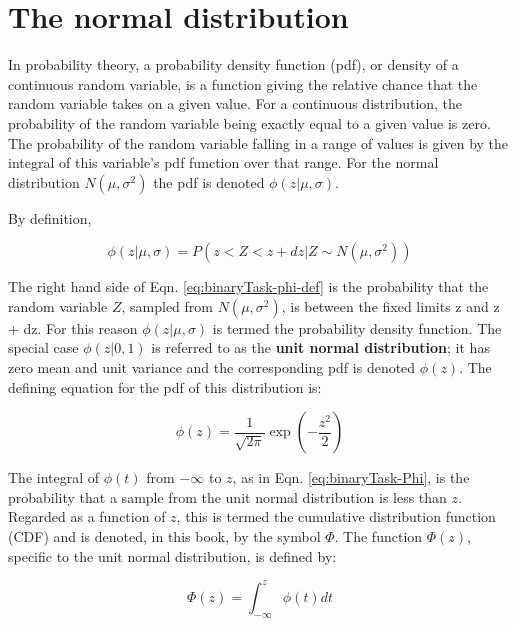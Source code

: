\documentclass[
]{book}
\begin{document}
\hypertarget{the-normal-distribution}{%
\section{The normal distribution}\label{the-normal-distribution}}

In probability theory, a probability density function (pdf), or density of a continuous random variable, is a function giving the relative chance that the random variable takes on a given value. For a continuous distribution, the probability of the random variable being exactly equal to a given value is zero. The probability of the random variable falling in a range of values is given by the integral of this variable's pdf function over that range. For the normal distribution \(N(\mu,\sigma^2)\) the pdf is denoted \(\phi(z|\mu,\sigma)\).

By definition,

\begin{equation} 
\phi\left ( z|\mu,\sigma \right )=P(z<Z<z+dz|Z \sim N(\mu,\sigma^2))
\label{eq:binaryTask-phi-def}
\end{equation}

The right hand side of Eqn. \eqref{eq:binaryTask-phi-def} is the probability that the random variable \(Z\), sampled from \(N(\mu,\sigma^2)\), is between the fixed limits z and z + dz. For this reason \(\phi(z|\mu,\sigma)\) is termed the probability density function. The special case \(\phi(z|0,1)\) is referred to as the \textbf{unit normal distribution}; it has zero mean and unit variance and the corresponding pdf is denoted \(\phi(z)\). The defining equation for the pdf of this distribution is:

\begin{equation} 
\phi\left ( z \right )=\frac{1}{\sqrt{2\pi}}\exp\left ( -\frac{z^2}{2} \right )
\label{eq:binaryTask-phi}
\end{equation}

The integral of \(\phi(t)\) from \(-\infty\) to \(z\), as in Eqn. \eqref{eq:binaryTask-Phi}, is the probability that a sample from the unit normal distribution is less than \(z\). Regarded as a function of \(z\), this is termed the cumulative distribution function (CDF) and is denoted, in this book, by the symbol \(\Phi\). The function \(\Phi(z)\), specific to the unit normal distribution, is defined by:

\begin{equation} 
\Phi\left ( z \right )=\int_{-\infty }^{z}\phi(t)dt
\label{eq:binaryTask-Phi}
\end{equation}
\end{document}
